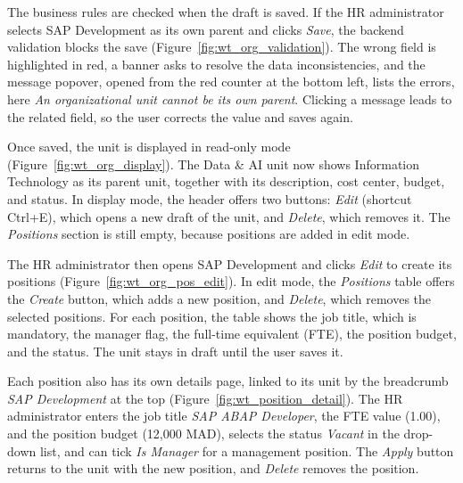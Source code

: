 
The business rules are checked when the draft is saved. If the HR administrator selects SAP Development as its own parent and clicks \emph{Save}, the backend validation blocks the save (Figure~\ref{fig:wt_org_validation}). The wrong field is highlighted in red, a banner asks to resolve the data inconsistencies, and the message popover, opened from the red counter at the bottom left, lists the errors, here \emph{An organizational unit cannot be its own parent}. Clicking a message leads to the related field, so the user corrects the value and saves again.


Once saved, the unit is displayed in read-only mode (Figure~\ref{fig:wt_org_display}). The Data \& AI unit now shows Information Technology as its parent unit, together with its description, cost center, budget, and status. In display mode, the header offers two buttons: \emph{Edit} (shortcut Ctrl+E), which opens a new draft of the unit, and \emph{Delete}, which removes it. The \emph{Positions} section is still empty, because positions are added in edit mode.


The HR administrator then opens SAP Development and clicks \emph{Edit} to create its positions (Figure~\ref{fig:wt_org_pos_edit}). In edit mode, the \emph{Positions} table offers the \emph{Create} button, which adds a new position, and \emph{Delete}, which removes the selected positions. For each position, the table shows the job title, which is mandatory, the manager flag, the full-time equivalent (FTE), the position budget, and the status. The unit stays in draft until the user saves it.


Each position also has its own details page, linked to its unit by the breadcrumb \emph{SAP Development} at the top (Figure~\ref{fig:wt_position_detail}). The HR administrator enters the job title \emph{SAP ABAP Developer}, the FTE value (1.00), and the position budget (12,000 MAD), selects the status \emph{Vacant} in the drop-down list, and can tick \emph{Is Manager} for a management position. The \emph{Apply} button returns to the unit with the new position, and \emph{Delete} removes the position.

